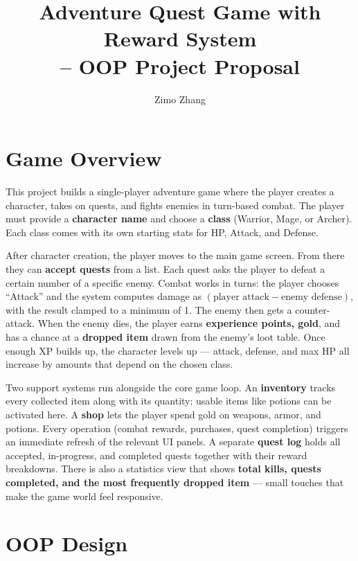 \documentclass[12pt,a4paper]{article}
\title{\textbf{Adventure Quest Game with Reward System\\-- OOP Project Proposal}}
\author{Zimo Zhang}
\date{}
\begin{document}
\maketitle

\section{Game Overview}

This project builds a single-player adventure game where the player creates a character, takes on quests, and fights enemies in turn-based combat. The player must provide a \textbf{character name} and choose a \textbf{class} (Warrior, Mage, or Archer). Each class comes with its own starting stats for HP, Attack, and Defense.

After character creation, the player moves to the main game screen. From there they can \textbf{accept quests} from a list. Each quest asks the player to defeat a certain number of a specific enemy. Combat works in turns: the player chooses ``Attack'' and the system computes damage as $(\text{player attack} - \text{enemy defense})$, with the result clamped to a minimum of 1. The enemy then gets a counter-attack. When the enemy dies, the player earns \textbf{experience points, gold}, and has a chance at a \textbf{dropped item} drawn from the enemy's loot table. Once enough XP builds up, the character levels up --- attack, defense, and max HP all increase by amounts that depend on the chosen class.

Two support systems run alongside the core game loop. An \textbf{inventory} tracks every collected item along with its quantity; usable items like potions can be activated here. A \textbf{shop} lets the player spend gold on weapons, armor, and potions. Every operation (combat rewards, purchases, quest completion) triggers an immediate refresh of the relevant UI panels. A separate \textbf{quest log} holds all accepted, in-progress, and completed quests together with their reward breakdowns. There is also a statistics view that shows \textbf{total kills, quests completed, and the most frequently dropped item} --- small touches that make the game world feel responsive.

\section{OOP Design}
\end{document}

